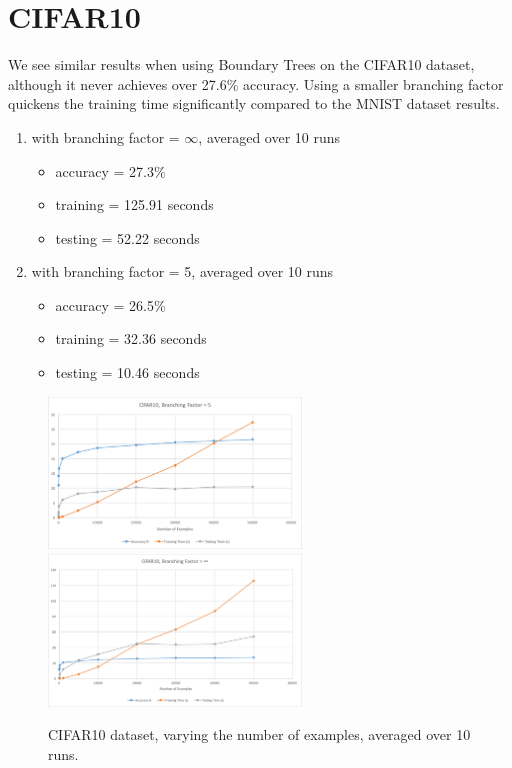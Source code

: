 \documentclass[10pt,letterpaper]{article}
\begin{document}
		
	\section{CIFAR10}
	\hspace{5mm}We see similar results when using Boundary Trees on the CIFAR10 dataset, although it never achieves over 27.6$\%$ accuracy. Using a smaller branching factor quickens the training time significantly compared to the MNIST dataset results.
	
	\begin{enumerate}	
		\item with branching factor = $\infty$, averaged over 10 runs
		\begin{itemize}
			\item accuracy = 27.3$\%$
			\item training = 125.91 seconds
			\item testing = 52.22 seconds
		\end{itemize}
		\item with branching factor = 5, averaged over 10 runs
		\begin{itemize}
			\item accuracy = 26.5$\%$
			\item training = 32.36 seconds
			\item testing = 10.46 seconds
		\end{itemize}
	\end{enumerate}
	\begin{figure}[H]
	\caption{CIFAR10 dataset, varying the number of examples, averaged over 10 runs.}
	\centering
	\includegraphics[width=0.60\textwidth]{cifar10k5.png}
	\includegraphics[width=0.60\textwidth]{cifar10kinfinity.png}
	\end{figure}
		
\end{document}
